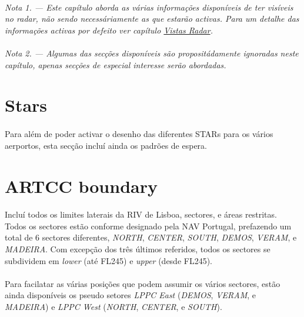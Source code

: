 \documentclass[10pt]{report}
\begin{document}
\paragraph*{} \textit{Nota 1. — Este capítulo aborda as várias informações disponíveis de ter
visíveis no radar, não sendo necessáriamente as que estarão activas. Para um detalhe das
informações activas por defeito ver capítulo \hyperref[cap:vistas]{Vistas Radar}.}

\paragraph*{} \textit{Nota 2. — Algumas das secções disponíveis são propositádamente ignoradas
neste capítulo, apenas secções de especial interesse serão abordadas.}

\section{Stars}

\paragraph*{} Para além de poder activar o desenho das diferentes STARs para os vários aerportos,
esta secção incluí ainda os padrões de espera.

\section{ARTCC boundary}

\paragraph*{} Incluí todos os limites laterais da RIV de Lisboa, sectores, e áreas restritas. Todos
os sectores estão conforme designado pela NAV Portugal, prefazendo um total de 6 sectores
diferentes, \textit{NORTH}, \textit{CENTER}, \textit{SOUTH}, \textit{DEMOS}, \textit{VERAM}, e
\textit{MADEIRA}. Com excepção dos três últimos referidos, todos os sectores se subdividem em
\textit{lower} (até FL245) e \textit{upper} (desde FL245).

\paragraph*{} Para facilatar as várias posições que podem assumir os vários sectores, estão ainda
disponíveis os pseudo setores \textit{LPPC East} (\textit{DEMOS}, \textit{VERAM}, e
\textit{MADEIRA}) e \textit{LPPC West} (\textit{NORTH}, \textit{CENTER}, e \textit{SOUTH}).
\end{document}
